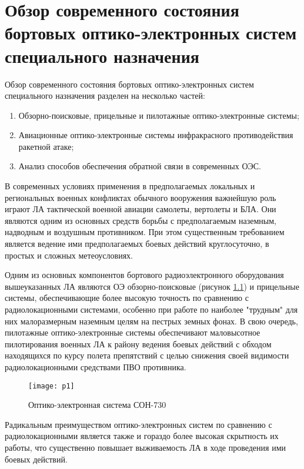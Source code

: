 \chapter{Обзор современного состояния бортовых оптико-электронных систем специального назначения} \label{ch:ch1}

Обзор современного состояния бортовых оптико-электронных систем специального назначения разделен на несколько частей:
\begin{enumerate}
  \item Обзорно-поисковые, прицельные и пилотажные оптико-электронные системы;
  \item Авиационные оптико-электронные системы инфракрасного противодействия ракетной атаке;
  \item Анализ способов обеспечения обратной связи в современных ОЭС.
\end{enumerate}

В современных условиях применения в предполагаемых локальных и региональных военных конфликтах обычного вооружения важнейшую роль играют ЛА тактической военной авиации самолеты, вертолеты и БЛА. Они являются одним из основных средств борьбы с предполагаемым наземным, надводным и воздушным противником. При этом существенным требованием является ведение ими предполагаемых боевых действий круглосуточно, в простых и сложных метеоусловиях. 

Одним из основных компонентов бортового радиоэлектронного оборудования вышеуказанных ЛА являются ОЭ обзорно-поисковые 
(рисунок \ref{fig:soep}) и прицельные системы, обеспечивающие более высокую точность по сравнению с радиолокационными системами, особенно при работе по наиболее "трудным" для них малоразмерным наземным целям на пестрых земных фонах. В свою очередь, пилотажные оптико-электронные системы обеспечивают маловысотное пилотирования военных ЛА к району ведения боевых действий с обходом находящихся по курсу полета препятствий с целью снижения своей видимости радиолокационными средствами ПВО противника.

\begin{figure}[ht]
  \texttt{[image: p1]} 
  \caption{Оптико-электронная система СОН-730}
  \label{fig:soep}
\end{figure}

Радикальным преимуществом оптико-электронных систем по сравнению с радиолокационными является также и гораздо более высокая скрытность их работы, что существенно повышает выживаемость ЛА в ходе проведения ими боевых действий. 


